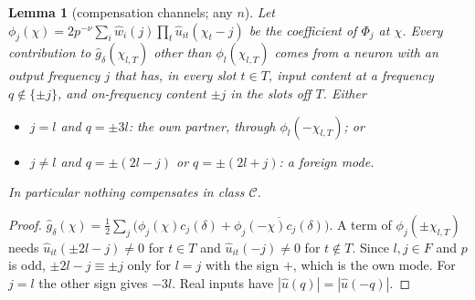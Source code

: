 \documentclass[11pt]{article}
\newtheorem{lemma}[theorem]{Lemma}
\theoremstyle{definition}
\begin{document}
\begin{lemma}[compensation channels; any $n$]\label{lem:channels}
Let $\phi_j(\chi)=2p^{-\nu}\sum_i\hat w_i(j)\prod_t\hat u_{it}(\chi_t-j)$ be the coefficient of $\Phi_j$ at $\chi$.  Every contribution to
$\hat g_\delta(\chi_{l,T})$ other than $\phi_l(\chi_{l,T})$ comes from a neuron with an output frequency $j$ that has, in every slot $t\in T$,
input content at a frequency $q\notin\{\pm j\}$, and on-frequency content $\pm j$ in the slots off $T$.  Either
\begin{itemize}
\item[(i)] $j=l$ and $q=\pm3l$: the \emph{own partner}, through $\phi_l(-\chi_{l,T})$; or
\item[(ii)] $j\ne l$ and $q=\pm(2l-j)$ or $q=\pm(2l+j)$: a \emph{foreign mode}.
\end{itemize}
In particular nothing compensates in class $\mathcal C$.
\end{lemma}
\begin{proof}
$\hat g_\delta(\chi)=\frac12\sum_j\big(\phi_j(\chi)c_j(\delta)+\overline{\phi_j(-\chi)c_j(\delta)}\big)$.  A term of $\phi_j(\pm\chi_{l,T})$ needs
$\hat u_{it}(\pm2l-j)\ne0$ for $t\in T$ and $\hat u_{it}(-j)\ne0$ for $t\notin T$.  Since $l,j\in F$ and $p$ is odd, $\pm2l-j\equiv\pm j$ only for
$l=j$ with the sign $+$, which is the own mode.  For $j=l$ the other sign gives $-3l$.  Real inputs have $|\hat u(q)|=|\hat u(-q)|$.
\end{proof}
\end{document}
